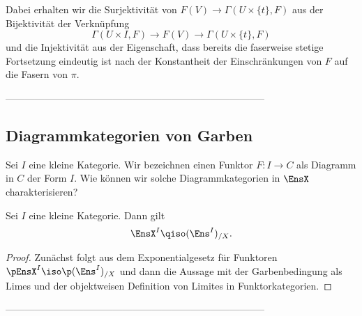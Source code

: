 Dabei erhalten wir die Surjektivität von
$F(V) \to \Gamma(U \times \{t\}, F)$ aus der Bijektivität der
Verknüpfung
\[ \Gamma(U \times I, F) \to F(V) \to \Gamma(U \times \{t\}, F) \]
und die Injektivität aus der Eigenschaft, dass bereits die faserweise
stetige Fortsetzung eindeutig ist nach der Konstantheit der
Einschränkungen von $F$ auf die Fasern von $\pi$.

--------------------------------------------------------------------------------


\subsection{Diagrammkategorien von Garben}

Sei $I$ eine kleine Kategorie. Wir bezeichnen einen Funktor $F: I \to
C$ als Diagramm in $C$ der Form $I$. Wie können wir solche
Diagrammkategorien in $\EnsX$ charakterisieren?

\begin{prop}
  Sei $I$ eine kleine Kategorie. Dann gilt
  \[ \EnsX^I \qiso (\Ens^I)_{/X}. \]
\end{prop}
\begin{proof}
  Zunächst folgt aus dem Exponentialgesetz für Funktoren
  $\pEnsX^I \iso \p (\Ens^I)_{/X}$ und dann die Aussage mit der
  Garbenbedingung als Limes und der objektweisen Definition von
  Limites in Funktorkategorien.
\end{proof}

--------------------------------------------------------------------------------




